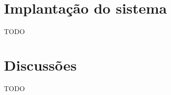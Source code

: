  
    
     

\section{Implantação do sistema}\label{sec:implantacaoSistema}

TODO

\section{Discussões}\label{sec:discussoes} 

TODO


